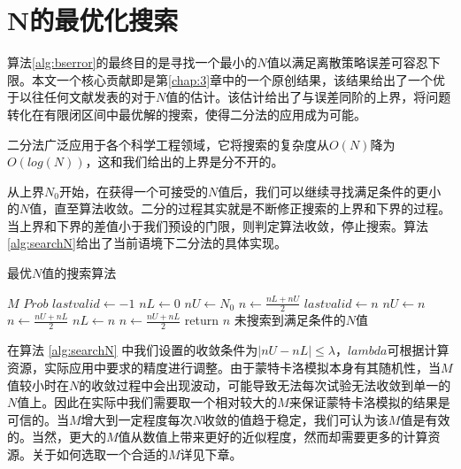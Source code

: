 \section{N的最优化搜索}
\label{sec:researchN}
算法\ref{alg:bserror}的最终目的是寻找一个最小的$N$值以满足离散策略误差可容忍下限。本文一个核心贡献即是第\ref{chap:3}章中的一个原创结果，该结果给出了一个优于以往任何文献发表的对于$N$值的估计。该估计给出了与误差同阶的上界，将问题转化在有限闭区间中最优解的搜索，使得二分法的应用成为可能。

二分法广泛应用于各个科学工程领域，它将搜索的复杂度从$O(N)$降为$O(log(N))$，这和我们给出的上界是分不开的。

从上界$N_0$开始，在获得一个可接受的$N$值后，我们可以继续寻找满足条件的更小的$N$值，直至算法收敛。二分的过程其实就是不断修正搜索的上界和下界的过程。当上界和下界的差值小于我们预设的门限，则判定算法收敛，停止搜索。算法\ref{alg:searchN}给出了当前语境下二分法的具体实现。
\begin{algorithm}
	\caption{最优$N$值的搜索算法}
	\label{alg:searchN}
	\begin{algorithmic}[1]
	  \Require $M$ 
          \Require $Prob$ 
	   
          \State $lastvalid \gets -1$ 
	  \State $nL \gets 0$  
	  \State $nU \gets N_0$ 
	  \State $n \gets \frac{nL + nU}{2}$
	   
          \State $lastvalid \gets n$
	  \State $nU \gets n$
	  \State $n \gets \frac{nU + nL}{2}$		
	  \Else  {}
	  \State $nL \gets n$
	  \State $n \gets \frac{nU + nL}{2}$
	  \EndIf
	  \EndWhile
	  \State return $n$
          \Else 
          \State $未搜索到满足条件的N值$ 
          \EndIf 
	  \EndProcedure
	\end{algorithmic}
\end{algorithm}
在算法 \ref{alg:searchN} 中我们设置的收敛条件为$|nU - nL| \le \lambda$，$lambda$可根据计算资源，实际应用中要求的精度进行调整。由于蒙特卡洛模拟本身有其随机性，当$M$值较小时在$N$的收敛过程中会出现波动，可能导致无法每次试验无法收敛到单一的$N$值上。因此在实际中我们需要取一个相对较大的$M$来保证蒙特卡洛模拟的结果是可信的。当$M$增大到一定程度每次$N$收敛的值趋于稳定，我们可认为该$M$值是有效的。当然，更大的$M$值从数值上带来更好的近似程度，然而却需要更多的计算资源。关于如何选取一个合适的$M$详见下章。

